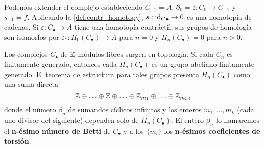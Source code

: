 Podemos extender el complejo estableciendo \( C_{-1} = A \), \( \partial_0 = \varepsilon: C_0 \to C_{-1} \) y \( s_{-1} = f \). Aplicando la \autoref{def:contr_homotopy}, \( s: {\operatorname{id}_C}_{\bullet} \rightarrow 0 \) es una homotopía de cadenas. Si \( \varepsilon: C_{\bullet} \to A \) tiene una homotopía contráctil, sus grupos de homología son isomorfos por \( \varepsilon_*: H_0(C_{\bullet}) \rightarrow A \) para \( n = 0 \) y \( H_n(C_{\bullet}) = 0 \) para \( n > 0 \).

Los complejos \( C_{\bullet} \) de $\mathbb{Z}$-módulos libres surgen en topología. Si cada \( C_n \) es finitamente generado, entonces cada \( H_n(C_{\bullet}) \) es un grupo abeliano finitamente generado. El teorema de estructura para tales grupos presenta \( H_n(C_{\bullet}) \) como una suma directa
\[ \mathbb{Z} \oplus \ldots \oplus \mathbb{Z} \oplus \ldots \oplus \mathbb{Z}_{m_1} \oplus \ldots \oplus \mathbb{Z}_{m_k}, \]
donde el número \( \beta_n \) de sumandos cíclicos infinitos y los enteros \( m_1, \ldots, m_k \) (cada uno divisor del siguiente) dependen solo de \( H_n(C_{\bullet}) \). El entero \( \beta_n \) lo llamaremos el \textbf{n-ésimo número de Betti} de \( C_{\bullet} \) y a los \( \{m_i\} \) los \textbf{n-ésimos coeficientes de torsión}.


\endinput
